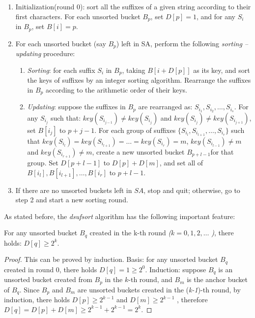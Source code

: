 \documentclass{ws-ijprai}
\begin{document}
\begin{enumerate}

\item Initialization(round 0): sort all the suffixes of a given
string according to their first characters. For each unsorted bucket
$B_p$, set $D[p] = 1$, and for any $S_i$ in $B_p$, set $B[i] = p$.

\item For each unsorted bucket (say $B_p$) left in
SA, perform the following \emph{sorting -- updating} procedure:

\begin{enumerate}[\bfseries i.]
\item \emph{Sorting}: for each suffix $S_i$ in $B_p$, taking
$B[i+D[p]]$ as its key, and sort the keys of suffixes by an integer
sorting algorithm. Rearrange the suffixes in $B_p$ according to the
arithmetic order of their keys.
\item \emph{Updating}: suppose the suffixes in $B_p$ are rearranged
as: $S_{i_1}, S_{i_2},\dots,S_{i_s}$. For any $S_{i_j}$ such that:
$key(S_{i_{j-1}}) \neq key(S_{i_j})$ and $key(S_{i_j}) \neq
key(S_{i_{j+1}})$, set $B[i_j]$ to $p+j-1$. For each group of suffixes
$\{S_{i_l}, S_{i_{l+1}},\dots,S_{i_r}\}$ such that $key(S_{i_l}) =
key(S_{i_{l+1}}) = \dots = key(S_{i_r}) = m$, $key(S_{i_{l-1}}) \neq
m$ and $key(S_{i_{r+1}}) \neq m$, create a new unsorted bucket
$B_{p+l-1}$for that group.  Set $D[p+l-1]$ to $D[p] + D[m]$, and set
all of $B[i_l], B[i_{l+1}], \dots, B[i_r]$ to $p+l-1$.
\end{enumerate}

\item If there are no unsorted buckets left in $SA$, stop and quit;
otherwise, go to step 2 and start a new sorting round.

\end{enumerate}

As stated before, the \emph{dsufsort} algorithm has the following important feature:

\begin{lemma}
  For any unsorted bucket $B_q$ created in the k-th round \emph{(}$k =
0,1,2,\dots$ \emph{)}, there holds: $D[q] \geq 2^k$.
\end{lemma}

\begin{proof} This can be proved by induction. Basis: for any unsorted
bucket $B_q$ created in round 0, there holds $D[q] = 1 \geq 2^0$.
Induction: suppose $B_q$ is an unsorted bucket created from $B_p$ in
the $k$-th round, and $B_m$ is the anchor bucket of $B_q$. Since $B_p$
and $B_m$ are unsorted buckets created in the (\emph{k-1})-th round,
by induction, there holds $D[p] \geq 2^{k-1}$ and $D[m] \geq 2^{k-1}$
, therefore $D[q] = D[p] + D[m] \geq 2^{k-1} + 2^{k-1} = 2^k$.
\end{proof}
\end{document}
